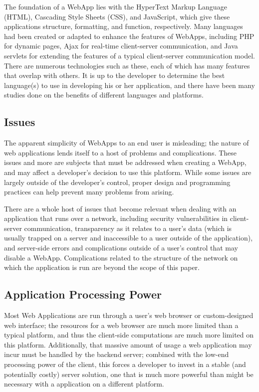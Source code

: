 \documentclass{acmsmall}
\begin{document}
The foundation of a WebApp lies with the HyperText Markup Language (HTML), Cascading Style Sheets (CSS), and JavaScript, which give these applications structure, formatting, and function, respectively.\cite{w3standards}  Many languages had been created or adapted to enhance the features of WebApps, including PHP for dynamic pages\cite{php}, Ajax for real-time client-server communication\cite{ajaxbook}, and Java servlets for extending the features of a typical client-server communication model\cite{javaservlet}.  There are numerous technologies such as these, each of which has many features that overlap with others.  It is up to the developer to determine the best language(s) to use in developing his or her application, and there have been many studies done on the benefits of different languages and platforms.\cite{precheltLanguages}

\subsection{Issues}

The apparent simplicity of WebApps to an end user is misleading; the nature of web applications lends itself to a host of problems and complications.  These issues and more are subjects that must be addressed when creating a WebApp, and may affect a developer's decision to use this platform.  While some issues are largely outside of the developer's control, proper design and programming practices can help prevent many problems from arising.

There are a whole host of issues that become relevant when dealing with an application that runs over a network, including security vulnerabilities in client-server communication, transparency as it relates to a user's data (which is usually trapped on a server and inaccessible to a user outside of the application), and server-side errors and complications outside of a user's control that may disable a WebApp.  Complications related to the structure of the network on which the application is run are beyond the scope of this paper.

\subsection{Application Processing Power}

Most Web Applications are run through a user's web browser or custom-designed web interface; the resources for a web browser are much more limited than a typical platform, and thus the client-side computations are much more limited on this platform.\cite{okamotoWorkers}  Additionally, that massive amount of usage a web application may incur must be handled by the backend server; combined with the low-end processing power of the client, this forces a developer to invest in a stable (and potentially costly) server solution, one that is much more powerful than might be necessary with a application on a different platform.
\end{document}
